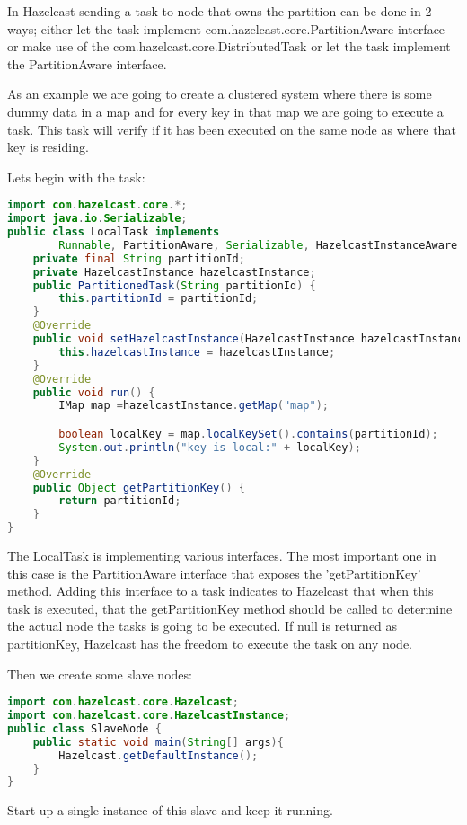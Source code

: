 In Hazelcast sending a task to node that owns the partition can be done in 2 ways; either let the task implement com.hazelcast.core.PartitionAware interface or make use of the com.hazelcast.core.DistributedTask or let the task implement the PartitionAware interface.

As an example we are going to create a clustered system where there is some dummy data in a map and for every key in that map we are going to execute a task. This task will verify if it has been executed on the same node as where that key is residing.

Lets begin with the task:
\begin{lstlisting}[language=java]
import com.hazelcast.core.*;
import java.io.Serializable;
public class LocalTask implements
        Runnable, PartitionAware, Serializable, HazelcastInstanceAware {
    private final String partitionId;
    private HazelcastInstance hazelcastInstance;
    public PartitionedTask(String partitionId) {
        this.partitionId = partitionId;
    }
    @Override
    public void setHazelcastInstance(HazelcastInstance hazelcastInstance) {
        this.hazelcastInstance = hazelcastInstance;
    }
    @Override
    public void run() {
        IMap map =hazelcastInstance.getMap("map");

        boolean localKey = map.localKeySet().contains(partitionId);
        System.out.println("key is local:" + localKey);
    }
    @Override
    public Object getPartitionKey() {
        return partitionId;
    }
}
\end{lstlisting}
The LocalTask is implementing various interfaces. The most important one in this case is the PartitionAware interface that exposes the 'getPartitionKey' method. Adding this interface to a task indicates to Hazelcast that when this task is executed, that the getPartitionKey method should be called to determine the actual node the tasks is going to be executed. If null is returned as partitionKey, Hazelcast has the freedom to execute the task on any node.

Then we create some slave nodes:
\begin{lstlisting}[language=java]
import com.hazelcast.core.Hazelcast;
import com.hazelcast.core.HazelcastInstance;
public class SlaveNode {
    public static void main(String[] args){
        Hazelcast.getDefaultInstance();
    }
}
\end{lstlisting}
Start up a single instance of this slave and keep it running.

